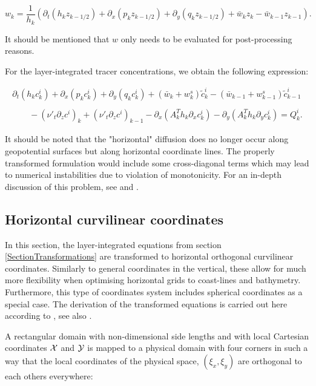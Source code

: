 \begin{equation}\label{conservative_w}
w_k=\frac{1}{h_k}\left(
\partial_t(h_kz_{k-1/2})+\partial_x(p_kz_{k-1/2})+\partial_y(q_kz_{k-1/2})
+\bar w_kz_k-\bar w_{k-1}z_{k-1}\right).
\end{equation}

It should be mentioned that $w$ only needs to be evaluated for
post-processing reasons.

For the layer-integrated tracer concentrations, we obtain 
the following expression:

\begin{equation}\label{C_Layer_Int}
\begin{array}{l}
\partial_t (h_k c^i_k) + \partial_x (p_kc^i_k)+\partial_y (q_k c^i_k)
+(\bar w_k+w^s_k) \tilde c^i_k 
- (\bar w_{k-1}+w^s_{k-1}) \tilde c^i_{k-1}\\
\\ \qquad
-(\nu'_t\partial_z c^i)_{k}
+(\nu'_t\partial_z c^i)_{k-1}
-\partial_x\left(A_k^Th_k\partial_xc^i_k\right)
-\partial_y\left(A_k^Th_k\partial_yc^i_k\right)
=Q^i_k.
\end{array}
\end{equation}

It should be noted that the "horizontal" diffusion does no longer occur 
along geopotential surfaces but along horizontal coordinate lines.
The properly transformed formulation would include some cross-diagonal
terms which may lead to numerical instabilities due to violation
of monotonicity. For an in-depth discussion of this
problem, see \cite{BECKERSea98} and \cite{BECKERSea00}.   


\subsection{Horizontal curvilinear coordinates}\label{SectionCurviCoords} 

In this section, the layer-integrated equations from
section \ref{SectionTransformations} 
are transformed to horizontal orthogonal curvilinear 
coordinates. Similarly to general coordinates in the vertical,
these allow for much more flexibility when optimising 
horizontal grids to coast-lines and bathymetry. 
Furthermore, this type of coordinates system includes 
spherical coordinates as a special case. 
The derivation of the transformed equations is carried out here
according to \cite{HAIDVOGELea99}, see also \cite{ARAKAWAea77}. 

A rectangular domain with non-dimensional side lengths  
and with local Cartesian coordinates ${\cal X}$ and ${\cal Y}$
is mapped to a physical domain with four corners in such a way
that the local coordinates of the physical space,
$(\xi_x,\xi_y)$ are orthogonal to each others everywhere:

